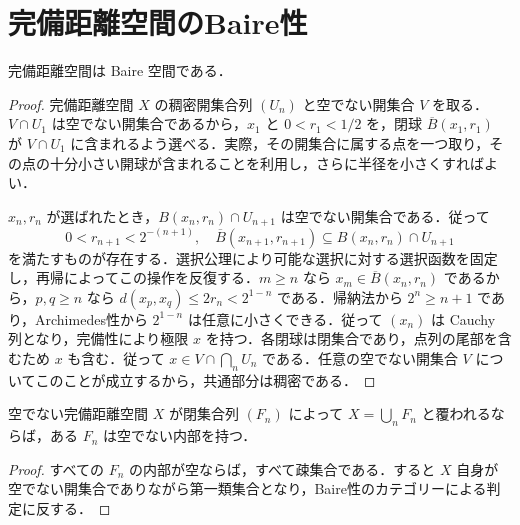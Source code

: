 \section{完備距離空間のBaire性}
\begin{prop}[Baireのカテゴリー定理]
完備距離空間は Baire 空間である．
\end{prop}
\begin{proof}
完備距離空間 $X$ の稠密開集合列 $(U_n)$ と空でない開集合 $V$ を取る．$V\cap U_1$ は空でない開集合であるから，$x_1$ と $0<r_1<1/2$ を，閉球 $\overline B(x_1,r_1)$ が $V\cap U_1$ に含まれるよう選べる．実際，その開集合に属する点を一つ取り，その点の十分小さい開球が含まれることを利用し，さらに半径を小さくすればよい．

$x_n,r_n$ が選ばれたとき，$B(x_n,r_n)\cap U_{n+1}$ は空でない開集合である．従って
\[
 0<r_{n+1}<2^{-(n+1)},\quad
 \overline B(x_{n+1},r_{n+1})
 \subseteq B(x_n,r_n)\cap U_{n+1}
\]
を満たすものが存在する．選択公理により可能な選択に対する選択函数を固定し，再帰によってこの操作を反復する．$m\geq n$ なら $x_m\in\overline B(x_n,r_n)$ であるから，$p,q\geq n$ なら $d(x_p,x_q)\leq2r_n<2^{1-n}$ である．帰納法から $2^n\geq n+1$ であり，Archimedes性から $2^{1-n}$ は任意に小さくできる．従って $(x_n)$ は Cauchy 列となり，完備性により極限 $x$ を持つ．各閉球は閉集合であり，点列の尾部を含むため $x$ も含む．従って $x\in V\cap\bigcap_n U_n$ である．任意の空でない開集合 $V$ についてこのことが成立するから，共通部分は稠密である．
\end{proof}
\begin{prop}[閉集合による可算被覆と内部]
空でない完備距離空間 $X$ が閉集合列 $(F_n)$ によって $X=\bigcup_n F_n$ と覆われるならば，ある $F_n$ は空でない内部を持つ．
\end{prop}
\begin{proof}
すべての $F_n$ の内部が空ならば，すべて疎集合である．すると $X$ 自身が空でない開集合でありながら第一類集合となり，Baire性のカテゴリーによる判定に反する．
\end{proof}
